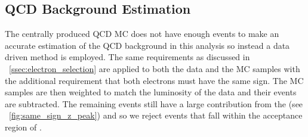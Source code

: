 
\subsection{QCD Background Estimation}

The centrally produced QCD MC does not have enough events to make an accurate
estimation of the QCD background in this analysis so instead a data driven
method is employed. The same requirements as discussed in
\SEC~\ref{ssec:electron_selection} are applied to both the data and the MC
samples with the additional requirement that both electrons must have the same
sign. The MC samples are then weighted to match the luminosity of the data and
their events are subtracted. The remaining events still have a large
contribution from the \Z (see \FIG~\ref{fig:same_sign_z_peak}) and so we reject
events that fall within the \mee acceptance region of \MassRange.

